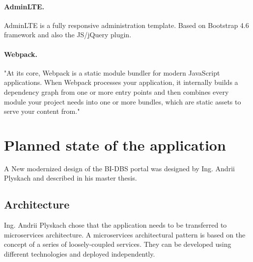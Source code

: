 \paragraph*{AdminLTE.} AdminLTE is a fully responsive administration template. Based on Bootstrap 4.6 framework and also the JS/jQuery plugin. 

\paragraph*{Webpack.}"At its core, Webpack is a static module bundler for modern JavaScript applications. When Webpack processes your application, it internally builds a dependency graph from one or more entry points and then combines every module your project needs into one or more bundles, which are static assets to serve your content from."







\section{Planned state of the application}
A New modernized design of the BI-DBS portal was designed by Ing. Andrii Plyskach and described in his master thesis.  


\subsection{Architecture}
Ing. Andrii Plyskach chose that the application needs to be transferred to microservices architecture.
A microservices architectural pattern is based on the concept of a series of loosely-coupled services. They can be developed using different technologies and deployed independently. 


